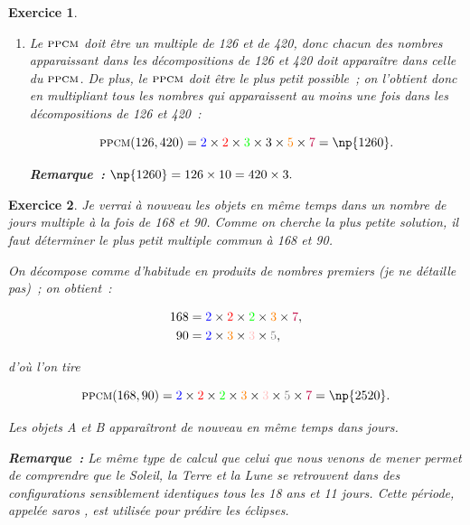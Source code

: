 \documentclass[10pt]{article}
\newtheorem{exo}{Exercice}
\begin{document}
\begin{exo}
\begin{enumerate}
\begin{multicols}{2}
\[420=\textcolor{blue}{2}\times \textcolor{red}{2}\times \textcolor{green}{3}\times \textcolor{orange}{5}\times  \textcolor{purple}{7}.\]


\end{multicols}


\item Le $\textsc{ppcm}$ doit être un multiple de 126 et de 420, donc chacun des nombres apparaissant dans les décompositions de 126 et 420 doit apparaître dans celle du $\textsc{ppcm}$. De plus, le $\textsc{ppcm}$ doit être le plus petit possible~; on l'obtient donc en multipliant tous les nombres qui apparaissent au moins une fois dans les décompositions de 126 et 420~:

 \[\textsc{ppcm}(126,420)=\textcolor{blue}{2}\times \textcolor{red}{2}\times \textcolor{green}{3}\times 3\times \textcolor{orange}{5}\times \textcolor{purple}{7}=\np{1260}.\]
 
 \medskip
 
 \textbf{Remarque~:} $\np{1260}=126\times 10=420\times 3.$

\end{enumerate}

\end{exo}

\begin{exo}

Je verrai à nouveau les objets en même temps dans un nombre de jours multiple à la fois de 168 et 90. Comme on cherche la plus petite solution, il faut déterminer le plus petit multiple commun à 168 et 90.

\medskip

On décompose comme d'habitude en produits de nombres premiers (je ne détaille pas)~; on obtient~:

\begin{align*}
168&=\textcolor{blue}{2}\times \textcolor{red}{2}\times \textcolor{green}{2}\times \textcolor{orange}{3}\times  \textcolor{purple}{7},\\
90&=\textcolor{blue}{2}\times  \textcolor{orange}{3}\times \textcolor{pink}{3}\times   \textcolor{gray}{5},
\end{align*}

d'où l'on tire

\[\textsc{ppcm}(168,90)=\textcolor{blue}{2}\times \textcolor{red}{2}\times \textcolor{green}{2}\times \textcolor{orange}{3}\times \textcolor{pink}{3}\times   \textcolor{gray}{5}\times  \textcolor{purple}{7}=\np{2520}.\]

Les objets A et B apparaîtront de nouveau en même temps dans  jours.

\medskip

\textbf{Remarque~:} Le même type de calcul que celui que nous venons de mener permet de comprendre que le Soleil, la Terre et la Lune se retrouvent dans des configurations sensiblement identiques tous les 18 ans et 11 jours. Cette période, appelée \og saros \fg , est utilisée pour prédire les éclipses. %

\end{exo}
\end{document}

